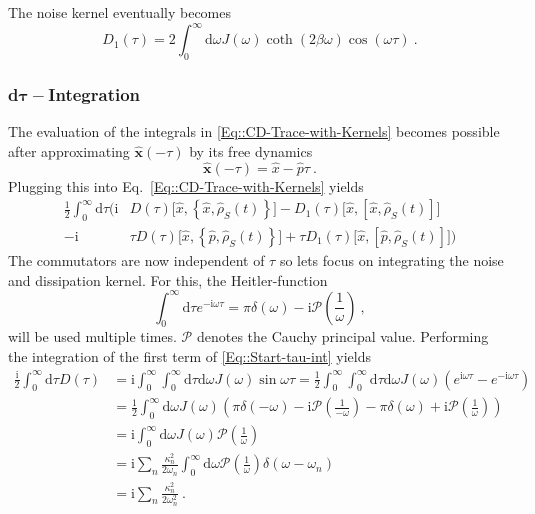 	The noise kernel eventually becomes
	\begin{equation}
		D_1(\tau) =	2 \int_0^\infty \text{d} \omega J(\omega) \coth \left(2\beta \omega\right) \cos \left(\omega \tau \right) ~.
	\end{equation}

	\subsubsection{d$\boldsymbol{\tau}-$Integration}
	The evaluation of the integrals in \eqref{Eq::CD-Trace-with-Kernels} becomes possible after approximating $\boldsymbol{\hat{x}}(-\tau)$ by its free dynamics
	\begin{equation}
		\boldsymbol{\hat{x}}(-\tau) =	\hat{x} - \hat{p} \tau~.
	\end{equation}
	Plugging this into Eq.~\eqref{Eq::CD-Trace-with-Kernels} yields
	\begin{equation} \label{Eq::Start-tau-int}
		\begin{split}
			\frac{1}{2} \int_{0}^{\infty} \text{d}\tau \Bigg({\mathrm{i}}& D(\tau) \Big[\hat{x}, \left\{\hat{x}, \hat{\rho}_S(t)\right\} \Big] - D_1(\tau) \Big[\hat{x}, \left[{\hat{x}} , \hat{\rho}_S(t)\right]\Big] \\
			- {\mathrm{i}}& \tau D(\tau) \Big[\hat{x}, \left\{\hat{p}, \hat{\rho}_S(t)\right\} \Big] + \tau D_1(\tau) \Big[\hat{x}, \left[\hat{p} , \hat{\rho}_S(t)\right]\Big] \Bigg)
		\end{split}
	\end{equation}
	The commutators are now independent of $\tau$ so lets focus on integrating the noise and dissipation kernel. For this, the Heitler-function
	\begin{equation}
		\int_0^\infty \text{d} \tau e^{-\mathrm{i} \omega \tau} =	\pi \delta(\omega) - \mathrm{i} \mathcal{P} \left(\frac{1}{\omega}\right)~,
	\end{equation}
	will be used multiple times. $\mathcal{P}$ denotes the Cauchy principal value. Performing the integration of the first term of \eqref{Eq::Start-tau-int} yields
	\begin{equation}
		\begin{split}
			\frac{\mathrm{i}}{2} \int_0^\infty \text{d}\tau D(\tau) &= \mathrm{i}\int_0^\infty \int_{0}^{\infty} \text{d}\tau	 \text{d}\omega J(\omega) \sin \omega \tau = \frac{1}{2} \int_0^\infty \int_{0}^{\infty} \text{d}\tau \text{d}\omega J(\omega) \left(e^{\mathrm{i} \omega \tau} - e^{-\mathrm{i}\omega \tau}\right) \\
			&= \frac{1}{2} \int_0^\infty \text{d}\omega J(\omega) \left(\pi \delta(-\omega) - \mathrm{i} \mathcal{P}\left(\frac{1}{-\omega}\right) - \pi \delta(\omega) + \mathrm{i} \mathcal{P} \left(\frac{1}{\omega}\right)\right) \\
			&= \mathrm{i} \int_0^\infty \text{d} \omega J(\omega) \mathcal{P} \left(\frac{1}{\omega}\right) \\
			&=	\mathrm{i} \sum_n \frac{\kappa_n^2}{2 \omega_n} \int_0^\infty \text{d} \omega  \mathcal{P} \left(\frac{1}{\omega}\right)	 \delta(\omega - \omega_n) \\
			&=	\mathrm{i} \sum_n \frac{\kappa_n^2}{2 \omega_n^2}~.
		\end{split}
	\end{equation}
